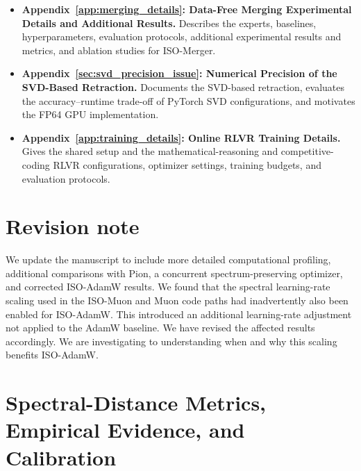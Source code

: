 \documentclass[11pt, a4paper]{utda}
\theoremstyle{plain}
\theoremstyle{definition}
\theoremstyle{remark}
\begin{document}
\begin{itemize}[
    leftmargin=*,
    itemsep=0.5em,
    topsep=0.5em,
    parsep=0pt
]
    \item \textbf{Appendix~\ref{app:merging_details}: Data-Free Merging
    Experimental Details and Additional Results.}
    Describes the experts, baselines, hyperparameters, evaluation protocols, additional experimental results and metrics, and ablation studies for ISO-Merger.

    \item \textbf{Appendix~\ref{sec:svd_precision_issue}: Numerical Precision of the SVD-Based Retraction.}
    Documents the SVD-based retraction, evaluates the accuracy--runtime
    trade-off of PyTorch SVD configurations, and motivates the FP64 GPU
    implementation.

    \item \textbf{Appendix~\ref{app:training_details}: Online RLVR Training
    Details.} Gives the shared setup and the mathematical-reasoning and competitive-coding
    RLVR configurations, optimizer settings, training budgets, and evaluation
    protocols.

\end{itemize}
\endgroup

\clearpage

\section*{Revision note}
We update the manuscript to include more detailed computational profiling,
additional comparisons with Pion, a concurrent spectrum-preserving
optimizer, and corrected ISO-AdamW results.
We found that the spectral learning-rate scaling used in the
ISO-Muon and Muon code paths had inadvertently also been enabled
for ISO-AdamW. This introduced an additional learning-rate
adjustment not applied to the AdamW baseline. We have revised
the affected results accordingly. 
We are investigating to understanding when and why this scaling benefits ISO-AdamW.

\section{Spectral-Distance Metrics, Empirical Evidence, and Calibration}
\label{app:spectral_diagnostics}
\end{document}
